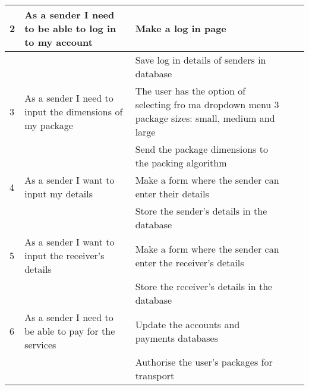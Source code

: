 \documentclass[paper=a4, fontsize=11pt]{scrartcl} %
\numberwithin{equation}{section} %
\numberwithin{figure}{section} %
\numberwithin{table}{section} %
\begin{document}
\begin{table}[]
\begin{tabular}{|p{1cm}|p{4cm}|p{4cm}|p{2cm}|p{2cm}|}
2           & As a sender I need to be able to log in to my account                           & Make a log in page                                                                                 &               &                     \\ \hline
            &                                                                                 & Save log in details of senders in database                                                         &               &                     \\ \hline
3           & As a sender I need to input the dimensions of my package                        & The user has the option of selecting fro ma dropdown menu 3 package sizes: small, medium and large &               &                     \\ \hline
            &                                                                                 & Send the package dimensions to the packing algorithm                                               &               &                     \\ \hline
4           & As a sender I want to input my details                                          & Make a form where the sender can enter their details                                               &               &                     \\ \hline
            &                                                                                 & Store the sender's details in the database                                                         &               &                     \\ \hline
5           & As a sender I want to input the receiver's details                              & Make a form where the sender can enter the receiver's details                                      &               &                     \\ \hline
            &                                                                                 & Store the receiver's details in the database                                                       &               &                     \\ \hline
6           & As a sender I need to be able to pay for the services                           & Update the accounts and payments databases                                                         &               &                     \\ \hline
            &                                                                                 & Authorise the user's packages for transport                                                        &               &                     \\ \hline

\end{tabular}
\end{table}
\end{document}
